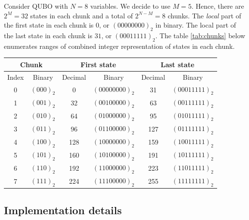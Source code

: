 \begin{example}
  Consider QUBO with $N=8$ variables. We decide to use $M=5$. Hence, there are $2^{M}=32$
  states in each chunk and a total of $2^{N-M}=8$ chunks. The \emph{local} part of the
  first state in each chunk is $0$, or $(00000000)_{2}$ in binary. The local part of the last state in each chunk is $31$, or $(00011111)_{2}$. The table \ref{tab:chunks} below enumerates ranges of combined integer representation of states in each chunk.
  \begin{table}[ht!]
    \centering
    \begin{tabular}{c|c|c|c|c|c}
      \hline
      \multicolumn{2}{c|}{Chunk}       &
      \multicolumn{2}{c|}{First state} &
      \multicolumn{2}{c}{Last state}    \\
      \hline
      Index&Binary&Decimal&Binary&Decimal&Binary\\
      \hline
      0&$(000)_2$&0&$(00000000)_{2}$&31&$(00011111)_{2}$\\
      1&$(001)_2$&32&$(00100000)_{2}$&63&$(00111111)_{2}$\\
      2&$(010)_2$&64&$(01000000)_{2}$&95&$(01011111)_{2}$\\
      3&$(011)_2$&96&$(01100000)_{2}$&127&$(01111111)_{2}$\\
      4&$(100)_2$&128&$(10000000)_{2}$&159&$(10011111)_{2}$\\
      5&$(101)_2$&160&$(10100000)_{2}$&191&$(10111111)_{2}$\\
      6&$(110)_2$&192&$(11000000)_{2}$&223&$(11011111)_{2}$\\
      7&$(111)_2$&224&$(11100000)_{2}$&255&$(11111111)_{2}$\\
      \hline
    \end{tabular}
  \end{table}

  \begin{table}{}

  \end{table}
\end{example}

\subsection{Implementation details}
